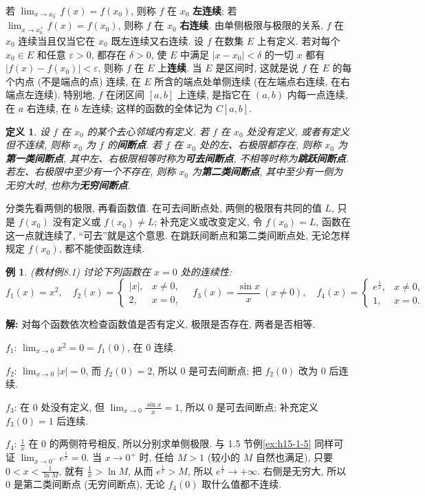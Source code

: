 \documentclass[UTF8,openany]{ctexbook}
\theoremstyle{chinesetextbook}
\newtheorem{definition}{定义}[section]
\newtheorem{example}{例}[section]
\newenvironment{cnsolution}{\par\indent\textbf{解:} \ignorespaces}{\par}
\begin{document}
若 $\displaystyle\lim_{x\to x_0^-}f(x)=f(x_0)$, 则称 $f$ 在 $x_0$ \textbf{左连续}; 若 $\displaystyle\lim_{x\to x_0^+}f(x)=f(x_0)$, 则称 $f$ 在 $x_0$ \textbf{右连续}. 由单侧极限与极限的关系, $f$ 在 $x_0$ 连续当且仅当它在 $x_0$ 既左连续又右连续. 设 $f$ 在数集 $E$ 上有定义. 若对每个 $x_0\in E$ 和任意 $\varepsilon>0$, 都存在 $\delta>0$, 使 $E$ 中满足 $|x-x_0|<\delta$ 的一切 $x$ 都有 $|f(x)-f(x_0)|<\varepsilon$, 则称 $f$ 在 $E$ 上\textbf{连续}. 当 $E$ 是区间时, 这就是说 $f$ 在 $E$ 的每个内点 (不是端点的点) 连续, 在 $E$ 所含的端点处单侧连续 (在左端点右连续, 在右端点左连续). 特别地, $f$ 在闭区间 $[a,b]$ 上连续, 是指它在 $(a,b)$ 内每一点连续, 在 $a$ 右连续, 在 $b$ 左连续; 这样的函数的全体记为 $C[a,b]$.
\begin{definition}
设 $f$ 在 $x_0$ 的某个去心邻域内有定义. 若 $f$ 在 $x_0$ 处没有定义, 或者有定义但不连续, 则称 $x_0$ 为 $f$ 的\textbf{间断点}. 若 $f$ 在 $x_0$ 处的左、右极限都存在, 则称 $x_0$ 为\textbf{第一类间断点}, 其中左、右极限相等时称为\textbf{可去间断点}, 不相等时称为\textbf{跳跃间断点}. 若左、右极限中至少有一个不存在, 则称 $x_0$ 为\textbf{第二类间断点}, 其中至少有一侧为无穷大时, 也称为\textbf{无穷间断点}.
\end{definition}
分类先看两侧的极限, 再看函数值. 在可去间断点处, 两侧的极限有共同的值 $L$, 只是 $f(x_0)$ 没有定义或 $f(x_0)\ne L$; 补充定义或改变定义, 令 $f(x_0)=L$, 函数在这一点就连续了, “可去”就是这个意思. 在跳跃间断点和第二类间断点处, 无论怎样规定 $f(x_0)$, 都不能使函数连续.
\begin{example}
\textnormal{(教材例8.1)} 讨论下列函数在 $x=0$ 处的连续性:
\[
f_1(x)=x^2,\quad f_2(x)=\begin{cases}|x|,&x\ne0,\\2,&x=0,\end{cases}\quad f_3(x)=\frac{\sin x}x\ (x\ne0),\quad f_4(x)=\begin{cases}e^{\frac1x},&x\ne0,\\1,&x=0.\end{cases}
\]
\end{example}
\begin{cnsolution}
对每个函数依次检查函数值是否有定义, 极限是否存在, 两者是否相等.

$f_1$: $\displaystyle\lim_{x\to0}x^2=0=f_1(0)$, 在 $0$ 连续.

$f_2$: $\displaystyle\lim_{x\to0}|x|=0$, 而 $f_2(0)=2$, 所以 $0$ 是可去间断点; 把 $f_2(0)$ 改为 $0$ 后连续.

$f_3$: 在 $0$ 处没有定义, 但 $\displaystyle\lim_{x\to0}\frac{\sin x}x=1$, 所以 $0$ 是可去间断点; 补充定义 $f_3(0)=1$ 后连续.

$f_4$: $\displaystyle\frac1x$ 在 $0$ 的两侧符号相反, 所以分别求单侧极限. 与 1.5 节例\ref{ex:h15-1-5} 同样可证 $\displaystyle\lim_{x\to0^-}e^{\frac1x}=0$. 当 $x\to0^+$ 时, 任给 $M>1$ (较小的 $M$ 自然也满足), 只要 $\displaystyle0<x<\frac1{\ln M}$, 就有 $\displaystyle\frac1x>\ln M$, 从而 $e^{\frac1x}>M$, 所以 $e^{\frac1x}\to+\infty$. 右侧是无穷大, 所以 $0$ 是第二类间断点 (无穷间断点), 无论 $f_4(0)$ 取什么值都不连续.
\end{cnsolution}
\end{document}
